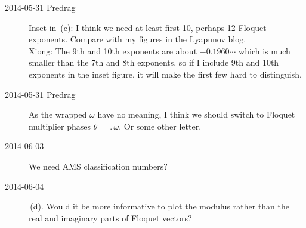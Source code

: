 \begin{description}
\item[2014-05-31 Predrag]
Inset in \,(c):
I think we need at least first 10, perhaps 12 Floquet exponents.
Compare with my figures in the Lyapunov blog. \\
Xiong: The 9th and 10th exponents are about $-0.1960\cdots$ which
is much smaller than the 7th and 8th exponents, so if I include 9th
and 10th exponents in the inset figure, it will make the first few hard to
distinguish.

\item[2014-05-31 Predrag]
As the wrapped $\omega$ have no meaning, I think we should switch to
Floquet multiplier phases $\theta =\period{} \omega$. Or some other letter.

\item[2014-06-03]
We need AMS classification numbers?

\item[2014-06-04]
 \,(d). Would it be more informative
to plot the modulus rather than the real and imaginary parts of
 Floquet vectors?



\end{description}

